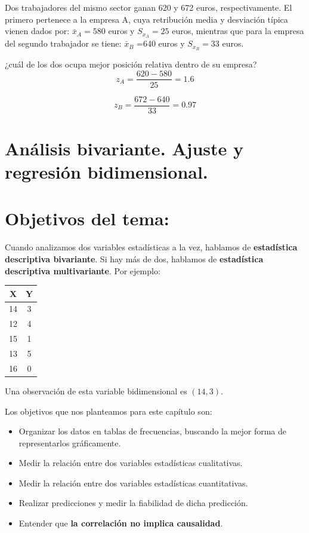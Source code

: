 \documentclass[]{book}
\theoremstyle{definition}
\theoremstyle{definition}
\theoremstyle{definition}
\theoremstyle{remark}
\begin{document}
Dos trabajadores del mismo sector ganan 620 y 672 euros,
respectivamente. El primero pertenece a la empresa A, cuya retribución
media y desviación típica vienen dados por: \(\bar{x}_A= 580\) euros y
\(S_{x_A} = 25\) euros, mientras que para la empresa del segundo
trabajador se tiene: \(\bar{x}_B\) =640 euros y \(S_{x_B} = 33\) euros.

¿cuál de los dos ocupa mejor posición relativa dentro de su empresa?
\[z_A=\frac{620-580}{25}=1.6\]

\[z_B=\frac{672-640}{33}=0.97\]

\chapter{Análisis bivariante. Ajuste y regresión
bidimensional.}\label{analisis-bivariante.-ajuste-y-regresion-bidimensional.}

\chapter{Objetivos del tema:}\label{objetivos-del-tema}

Cuando analizamos dos variables estadísticas a la vez, hablamos de
\textbf{estadística descriptiva bivariante}. Si hay más de dos, hablamos
de \textbf{estadística descriptiva multivariante}. Por ejemplo:

\begin{longtable}[]{@{}cc@{}}
\toprule
X & Y\tabularnewline
\midrule
\endhead
14 & 3\tabularnewline
12 & 4\tabularnewline
15 & 1\tabularnewline
13 & 5\tabularnewline
16 & 0\tabularnewline
\bottomrule
\end{longtable}

Una observación de esta variable bidimensional es \((14,3)\).

Los objetivos que nos planteamos para este capítulo son:

\begin{itemize}
\item
  Organizar los datos en tablas de frecuencias, buscando la mejor forma
  de representarlos gráficamente.
\item
  Medir la relación entre dos variables estadísticas cualitativas.
\item
  Medir la relación entre dos variables estadísticas cuantitativas.
\item
  Realizar predicciones y medir la fiabilidad de dicha predicción.
\item
  Entender que \textbf{la correlación no implica causalidad}.
\end{itemize}


\end{document}
